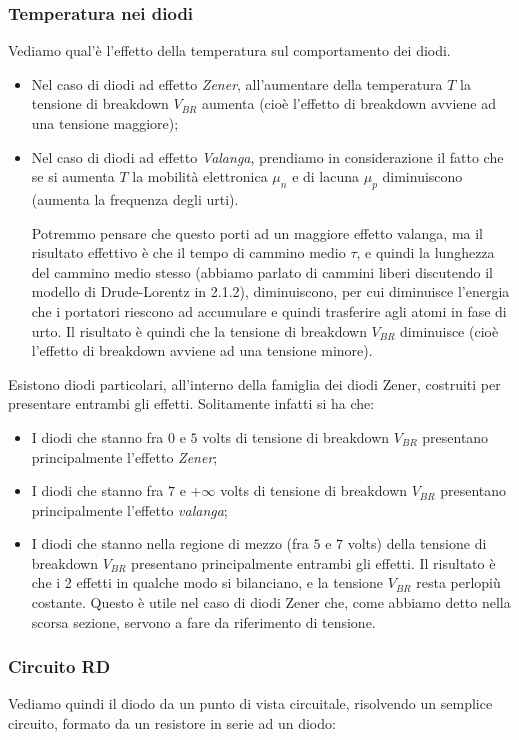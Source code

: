 \documentclass[a4paper,11pt]{article}
\begin{document}
\subsubsection{Temperatura nei diodi}
Vediamo qual'è l'effetto della temperatura sul comportamento dei diodi.
\begin{itemize}
	\item Nel caso di diodi ad effetto \textit{Zener}, all'aumentare della temperatura $T$ la tensione di breakdown $V_{BR}$ aumenta (cioè l'effetto di breakdown avviene ad una tensione maggiore);
	\item Nel caso di diodi ad effetto \textit{Valanga}, prendiamo in considerazione il fatto che se si aumenta $T$ la mobilità elettronica $\mu_n$ e di lacuna $\mu_p$ diminuiscono (aumenta la frequenza degli urti).

		Potremmo pensare che questo porti ad un maggiore effetto valanga, ma il risultato effettivo è che il tempo di cammino medio $\tau$, e quindi la lunghezza del cammino medio stesso (abbiamo parlato di cammini liberi discutendo il modello di Drude-Lorentz in 2.1.2), diminuiscono, per cui diminuisce l'energia che i portatori riescono ad accumulare e quindi trasferire agli atomi in fase di urto.
		Il risultato è quindi che la tensione di breakdown $V_{BR}$ diminuisce (cioè l'effetto di breakdown avviene ad una tensione minore).
\end{itemize}

Esistono diodi particolari, all'interno della famiglia dei diodi Zener, costruiti per presentare entrambi gli effetti. Solitamente infatti si ha che:
\begin{itemize}
	\item I diodi che stanno fra $0$ e $5$ volts di tensione di breakdown $V_{BR}$ presentano principalmente l'effetto \textit{Zener};
	\item I diodi che stanno fra $7$ e $+\infty$ volts di tensione di breakdown $V_{BR}$ presentano principalmente l'effetto \textit{valanga};
	\item I diodi che stanno nella regione di mezzo (fra $5$ e $7$ volts) della tensione di breakdown $V_{BR}$ presentano principalmente entrambi gli effetti. Il risultato è che i 2 effetti in qualche modo si bilanciano, e la tensione $V_{BR}$ resta perlopiù costante. Questo è utile nel caso di diodi Zener che, come abbiamo detto nella scorsa sezione, servono a fare da riferimento di tensione. 
\end{itemize}

\subsubsection{Circuito RD}
Vediamo quindi il diodo da un punto di vista circuitale, risolvendo un semplice circuito, formato da un resistore in serie ad un diodo:
\begin{center}
\end{center}
\end{document}
